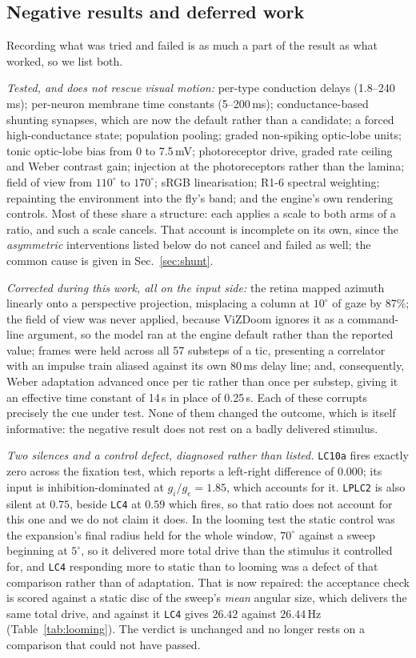 \documentclass[10pt,twoside]{article}
\newcommand{\cell}[1]{\texttt{#1}}
\begin{document}
\subsection{Negative results and deferred work}

Recording what was tried and failed is as much a part of the result as what
worked, so we list both.

\emph{Tested, and does not rescue visual motion:} per-type conduction delays
(1.8--240\,ms); per-neuron membrane time constants (5--200\,ms);
conductance-based shunting synapses, which are now the default rather than a
candidate; a forced high-conductance state; population pooling; graded
non-spiking optic-lobe units; tonic optic-lobe bias from 0 to 7.5\,mV;
photoreceptor drive, graded rate ceiling and Weber contrast gain; injection at
the photoreceptors rather than the lamina; field of view from $110^\circ$ to
$170^\circ$; sRGB linearisation; R1-6 spectral weighting; repainting the
environment into the fly's band; and the engine's own rendering controls. Most of these share a
structure: each applies a scale to both arms of a ratio, and such a scale
cancels. That account is incomplete on its own, since the \emph{asymmetric}
interventions listed below do not cancel and failed as well; the common cause
is given in Sec.~\ref{sec:shunt}.

\emph{Corrected during this work, all on the input side:} the retina mapped
azimuth linearly onto a perspective projection, misplacing a column at
$10^\circ$ of gaze by 87\%; the field of view was never applied, because
ViZDoom ignores it as a command-line argument, so the model ran at the engine
default rather than the reported value; frames were held across all 57 substeps
of a tic, presenting a correlator with an impulse train aliased against its own
80\,ms delay line; and, consequently, Weber adaptation advanced once per tic
rather than once per substep, giving it an effective time constant of 14\,s in
place of 0.25\,s. Each of these corrupts precisely the cue under test. None of
them changed the outcome, which is itself informative: the negative result does
not rest on a badly delivered stimulus.

\emph{Two silences and a control defect, diagnosed rather than listed.}
\cell{LC10a} fires exactly zero across the fixation test, which reports a
left-right difference of $0.000$; its input is inhibition-dominated at
$g_i/g_e = 1.85$, which accounts for it. \cell{LPLC2} is also silent at
$0.75$, beside \cell{LC4} at $0.59$ which fires, so that ratio does not
account for this one and we do not claim it does. In the looming test the
static control was the expansion's final radius held for the whole window,
$70^\circ$ against a sweep beginning at $5^\circ$, so it delivered more total
drive than the stimulus it controlled for, and \cell{LC4} responding more to
static than to looming was a defect of that comparison rather than of
adaptation. That is now repaired: the acceptance check is scored against a
static disc of the sweep's \emph{mean} angular size, which delivers the same
total drive, and against it \cell{LC4} gives $26.42$ against $26.44$\,Hz
(Table~\ref{tab:looming}). The verdict is unchanged and no longer rests on a
comparison that could not have passed.
\end{document}
